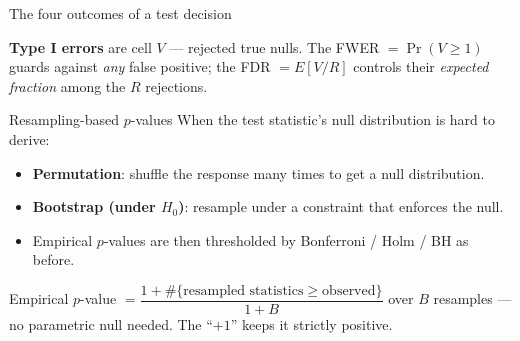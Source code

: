 \documentclass[aspectratio=169,11pt]{beamer}
\begin{document}
\begin{frame}{The four outcomes of a test decision}
  \begin{center}
  \end{center}
  \begin{takeaway}
    \textbf{Type I errors} are cell $V$ --- rejected true nulls. The FWER $=\Pr(V\ge 1)$ guards against \emph{any} false positive; the FDR $=E[V/R]$ controls their \emph{expected fraction} among the $R$ rejections.
  \end{takeaway}
\end{frame}

\begin{frame}{Resampling-based $p$-values}
  When the test statistic's null distribution is hard to derive:
  \begin{readme}
    \begin{itemize}
      \item \textbf{Permutation}: shuffle the response many times to
            get a null distribution.
      \item \textbf{Bootstrap (under $H_0$)}: resample under a
            constraint that enforces the null.
      \item Empirical $p$-values are then thresholded by Bonferroni /
            Holm / BH as before.
    \end{itemize}
  \end{readme}
  \begin{takeaway}
    Empirical $p$-value $=\dfrac{1+\#\{\text{resampled statistics}\ge\text{observed}\}}{1+B}$
    over $B$ resamples --- no parametric null needed. The ``$+1$'' keeps it strictly
    positive.
  \end{takeaway}
\end{frame}
\end{document}
